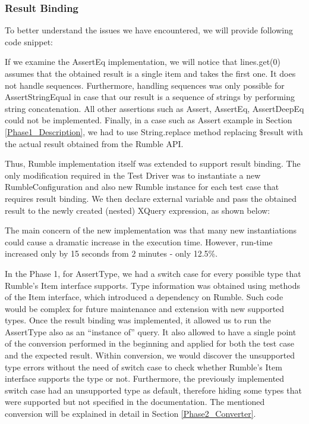 \subsubsection{Result Binding}
To better understand the issues we have encountered, we will provide following code snippet:



If we examine the AssertEq implementation, we will notice that lines.get(0) assumes that the obtained result is a single item and takes the first one. It does not handle sequences. Furthermore, handling sequences was only possible for AssertStringEqual in case that our result is a sequence of strings by performing string concatenation. All other assertions such as Assert, AssertEq, AssertDeepEq could not be implemented. Finally, in a case such as Assert example in Section \ref{Phase1_Description}, we had to use String.replace method replacing \$result with the actual result obtained from the Rumble API. 

Thus, Rumble implementation itself was extended to support result binding. The only modification required in the Test Driver was to instantiate a new RumbleConfiguration and also new Rumble instance for each test case that requires result binding. We then declare external variable and pass the obtained result to the newly created (nested) XQuery expression, as shown below:



The main concern of the new implementation was that many new instantiations could cause a dramatic increase in the execution time. However, run-time increased only by 15 seconds from 2 minutes - only 12.5\%.

In the Phase 1, for AssertType, we had a switch case for every possible type that Rumble's Item interface supports. Type information was obtained using methods of the Item interface, which introduced a dependency on Rumble. Such code would be complex for future maintenance and extension with new supported types. Once the result binding was implemented, it allowed us to run the AssertType also as an ``instance of'' query. It also allowed to have a single point of the conversion performed in the beginning and applied for both the test case and the expected result. Within conversion, we would discover the unsupported type errors without the need of switch case to check whether Rumble's Item interface supports the type or not. Furthermore, the previously implemented switch case had an unsupported type as default, therefore hiding some types that were supported but not specified in the documentation. The mentioned conversion will be explained in detail in Section \ref{Phase2_Converter}. 

